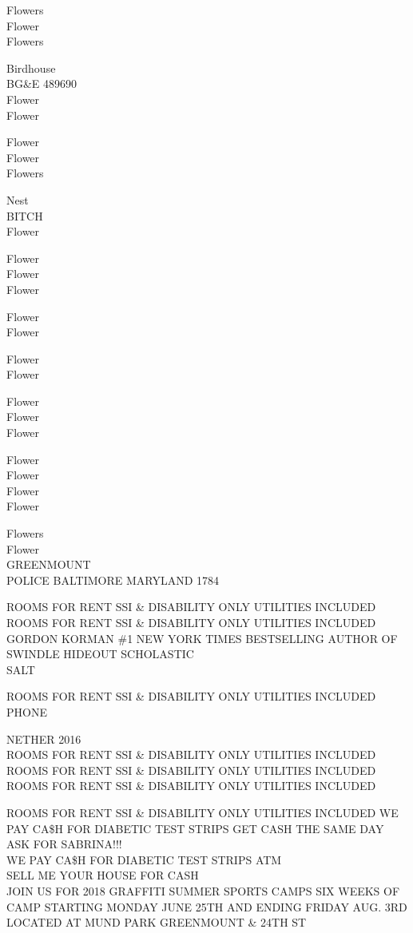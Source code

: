 \documentclass[10pt,letterpaper]{article}
\begin{document}
Flowers\\
Flower\\
Flowers

Birdhouse\\
BG\&E 489690\\
Flower\\
Flower

Flower\\
Flower\\
Flowers

Nest\\
BITCH\\
Flower

Flower\\
Flower\\
Flower

Flower\\
Flower

Flower\\
Flower

Flower\\
Flower\\
Flower

Flower\\
Flower\\
Flower\\
Flower

Flowers\\
Flower\\
GREENMOUNT\\
POLICE BALTIMORE MARYLAND 1784

ROOMS FOR RENT SSI \& DISABILITY ONLY UTILITIES INCLUDED\\
ROOMS FOR RENT SSI \& DISABILITY ONLY UTILITIES INCLUDED\\
GORDON KORMAN \#1 NEW YORK TIMES BESTSELLING AUTHOR OF SWINDLE HIDEOUT SCHOLASTIC\\
SALT

ROOMS FOR RENT SSI \& DISABILITY ONLY UTILITIES INCLUDED\\
PHONE

NETHER 2016\\
ROOMS FOR RENT SSI \& DISABILITY ONLY UTILITIES INCLUDED\\
ROOMS FOR RENT SSI \& DISABILITY ONLY UTILITIES INCLUDED\\
ROOMS FOR RENT SSI \& DISABILITY ONLY UTILITIES INCLUDED

ROOMS FOR RENT SSI \& DISABILITY ONLY UTILITIES INCLUDED WE PAY CA\$H FOR DIABETIC TEST STRIPS GET CASH THE SAME DAY ASK FOR SABRINA!!!\\
WE PAY CA\$H FOR DIABETIC TEST STRIPS ATM\\
SELL ME YOUR HOUSE FOR CASH\\
JOIN US FOR 2018 GRAFFITI SUMMER SPORTS CAMPS SIX WEEKS OF CAMP STARTING MONDAY JUNE 25TH AND ENDING FRIDAY AUG. 3RD LOCATED AT MUND PARK GREENMOUNT \& 24TH ST
\end{document}

